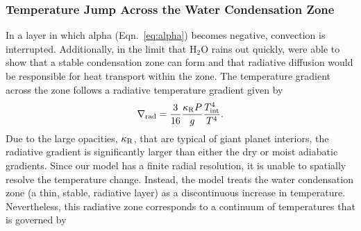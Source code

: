 \documentclass[11pt]{ucscthesisbs}
\begin{document}
\subsubsection{Temperature Jump Across the Water Condensation Zone}
In a layer in which alpha (Eqn.~\ref{eq:alpha}) becomes negative, convection is interrupted. Additionally, in the limit that H$_{2}$O rains out quickly, \citep{friedson_2017,leconte_2017} were able to show that a stable condensation zone can form and that radiative diffusion would be responsible for heat transport within the zone. The temperature gradient across the zone follows a radiative temperature gradient \citep{kippenhahn_2012} given by
\begin{align}
 \nabla_{\rm rad}= \frac{3}{16}\frac{\kappa_{\rm R} P}{g}\frac{T_{\rm int}^4}{T^4} .
  \label{eq:radiative_gradient}
\end{align}
Due to the large opacities, $\kappa_{\rm R}$, that are typical of giant planet interiors, the radiative gradient is significantly larger than either the dry or moist adiabatic gradients. Since our model has a finite radial resolution, it is unable to spatially resolve the temperature change. Instead, the model treats the water condensation zone (a thin, stable, radiative layer) as a discontinuous increase in temperature. Nevertheless, this radiative zone corresponds to a continuum of temperatures that is governed by
\end{document}
